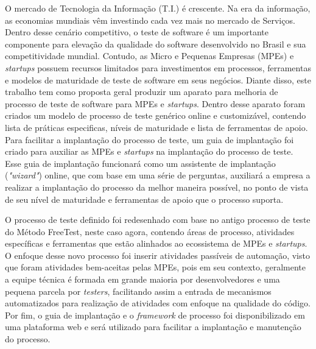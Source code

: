 
\begin{resumo} 
O mercado de Tecnologia da Informação (T.I.) é crescente. Na era da informação, as economias mundiais vêm investindo cada vez mais no mercado de Serviços. Dentro desse cenário competitivo, o teste de software é um importante componente para elevação da qualidade do software desenvolvido no Brasil e sua competitividade mundial. Contudo, as Micro e Pequenas Empresas (MPEs) e \textit{startups} possuem recursos limitados para investimentos em processos, ferramentas e modelos de maturidade de teste de software em seus negócios. Diante disso, este trabalho tem como proposta geral produzir um aparato para melhoria de processo de teste de software para MPEs e \textit{startups}. Dentro desse aparato foram criados um modelo de processo de teste genérico online e customizável, contendo lista de práticas especificas, níveis de maturidade e lista de ferramentas de apoio. Para facilitar a implantação do processo de teste, um guia de implantação foi criado para auxiliar as MPEs e \textit{startups} na implantação do processo de teste. Esse guia de implantação funcionará como um assistente de implantação (\textit{"wizard"}) online, que com base em uma série de perguntas, auxiliará a empresa a realizar a implantação do processo da melhor maneira possível, no ponto de vista de seu nível de maturidade e ferramentas de apoio que o processo suporta.

O processo de teste definido foi redesenhado com base no antigo processo de teste do Método FreeTest, neste caso agora, contendo áreas de processo, atividades específicas e ferramentas que estão alinhados ao ecossistema de MPEs e \textit{startups}. O enfoque desse novo processo foi inserir atividades passíveis de automação, visto que foram atividades bem-aceitas pelas MPEs, pois em seu contexto, geralmente a equipe técnica é formada em grande maioria por desenvolvedores e uma pequena parcela por \textit{testers}, facilitando assim a entrada de mecanismos automatizados para realização de atividades com enfoque na qualidade do código. Por fim, o guia de implantação e o \textit{framework} de processo foi disponibilizado em uma plataforma web e será utilizado para facilitar a implantação e manutenção do processo.

\end{resumo}


